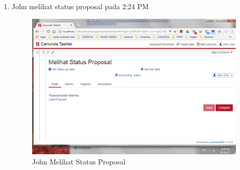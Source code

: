 \begin{enumerate}
		\item John melihat status proposal pada 2:24 PM
		\begin{figure}[H]
			\centering
			\includegraphics[scale=0.5]{Gambar/Bab-5/kasus1/8}
			\caption{John Melihat Status Proposal} 
			\label{fig:pengujian_kasus1_8}
	\end{figure}


\end{enumerate}



